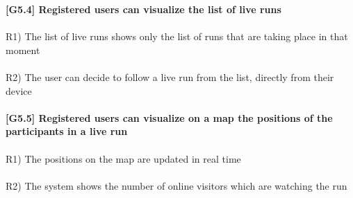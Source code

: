 \textbf{[G5.4] Registered users can visualize the list of live runs} \\ \\
R1) The list of live runs shows only the list of runs that are taking place in that moment \\ \\
R2) The user can decide to follow a live run from the list, directly from their device \\ \\
\textbf{[G5.5] Registered users can visualize on a map the positions of the participants in a live run} \\ \\	
R1) The positions on the map are updated in real time \\ \\
R2) The system shows the number of online visitors which are watching the run \\


